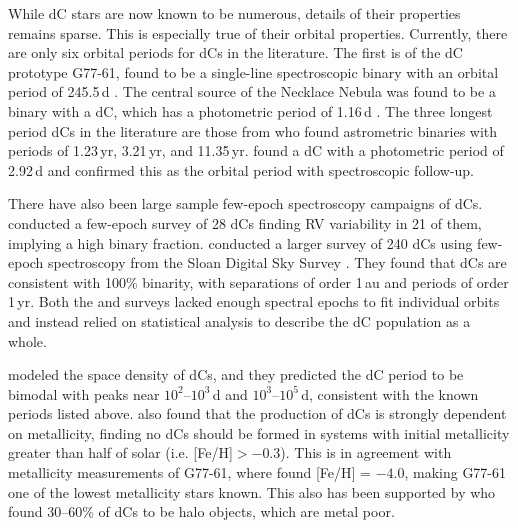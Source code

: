 \documentclass[twocolumn]{aastex631}
\begin{document}
While dC stars are now known to be numerous, details of their properties remains sparse. This is especially true of their orbital properties. Currently, there are only six orbital periods for dCs in the literature. The first is of the dC prototype G77-61, found to be a single-line spectroscopic binary with an orbital period of 245.5\,d \citep{Dearborn1986}. The central source of the Necklace Nebula was found to be a binary with a dC, which has a photometric period of 1.16\,d \citep{Corradi2011, Miszalski2013}. The three longest period dCs in the literature are those from \citet{Harris2018} who found astrometric binaries with periods of 1.23\,yr, 3.21\,yr, and 11.35\,yr. \citet{Margon2018} found a dC with a photometric period of 2.92\,d and confirmed this as the orbital period with spectroscopic follow-up. 


There have also been large sample few-epoch spectroscopy campaigns of dCs. \citet{Whitehouse2018} conducted a few-epoch survey of 28 dCs finding RV variability in 21 of them, implying a high binary fraction. \citet{Roulston2019} conducted a larger survey of 240 dCs using few-epoch spectroscopy from the Sloan Digital Sky Survey \citep[SDSS;][]{SDSS_4}. They found that dCs are consistent with 100\% binarity, with separations of order 1\,au and periods of order 1\,yr. Both the \citet{Whitehouse2018} and \citet{Roulston2019} surveys lacked enough spectral epochs to fit individual orbits and instead relied on statistical analysis to describe the dC population as a whole.

 \citet{Kool1995} modeled the space density of dCs, and they predicted the dC period to be bimodal with peaks near $10^2$--$10^3$\,d and $10^3$--$10^5$\,d, consistent with the known periods listed above. \citet{Kool1995} also found that the production of dCs is strongly dependent on metallicity, finding no dCs should be formed in systems with initial metallicity greater than half of solar (i.e. [Fe/H]$ > -0.3$). This is in agreement with metallicity measurements of G77-61, where \citet{Plez2005} found [Fe/H] = $-4.0$, making G77-61 one of the lowest metallicity stars known. This also has been supported by \citet{Farihi2018} who found 30--60\% of dCs to be halo objects, which are metal poor.
\end{document}
